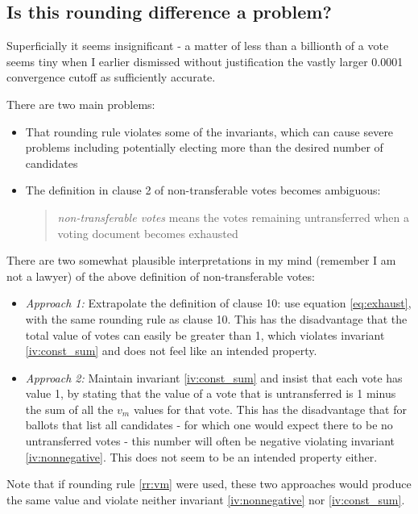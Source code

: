 \documentclass{article}
\begin{document}
\subsection{Is this rounding difference a problem?} 

\label{sec:roundingproblem}

Superficially it seems insignificant - a matter of less
than a billionth of a vote seems tiny when I earlier dismissed without justification
the vastly larger 0.0001 convergence cutoff as sufficiently accurate. 

There are two main problems:
\begin{itemize}
    \item That rounding rule violates some of the invariants, which can
    cause severe problems including potentially electing more than the desired number
    of candidates
    \item The definition in clause 2 of non-transferable votes becomes ambiguous:
    \begin{quote}
        \emph{non-transferable votes} means the votes remaining untransferred when a voting document becomes exhausted
    \end{quote}    
\end{itemize}

There are two somewhat plausible interpretations in my mind (remember I am not a lawyer)
of the above definition of non-transferable votes:
\begin{itemize}
\item \emph{Approach 1:} Extrapolate the definition of clause 10:
      use equation \ref{eq:exhaust}, with the same rounding rule as clause 10.
      This has the disadvantage that the total value of votes can easily be
      greater than 1, which violates invariant \ref{iv:const_sum} and does not
      feel like an intended property.
\item \emph{Approach 2:} Maintain invariant \ref{iv:const_sum} and insist that
      each vote has value 1, by stating that the value of a vote that is
      untransferred is 1 minus the sum of all the $v_m$ values for that vote.
      This has the disadvantage that for ballots that list all candidates - for
      which one would expect there to be no untransferred votes - this number
      will often be negative violating invariant \ref{iv:nonnegative}. 
      This does not seem to be an intended property either.
\end{itemize}

Note that if rounding rule \ref{rr:vm} were used, these two approaches would produce the
same value and violate neither invariant \ref{iv:nonnegative} nor \ref{iv:const_sum}.
\end{document}
